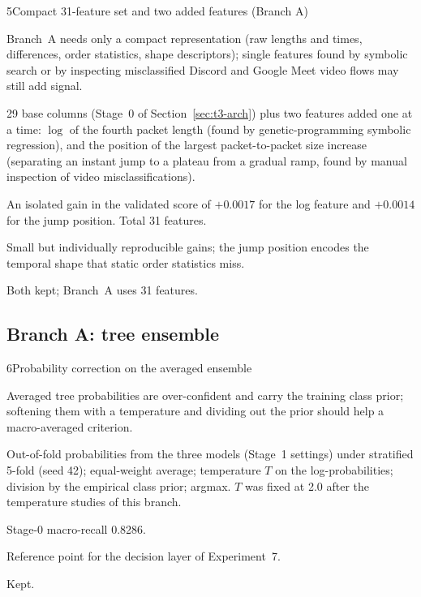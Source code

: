 \begin{explog}{5}{Compact 31-feature set and two added features (Branch A)}
\item[Hypothesis] Branch~A needs only a compact representation (raw lengths and times,
differences, order statistics, shape descriptors); single features found by
symbolic search or by inspecting misclassified Discord and Google Meet video flows
may still add signal.
\item[Method] 29 base columns (Stage~0 of Section~\ref{sec:t3-arch}) plus two features added one at a time:
$\log$ of the fourth packet length (found by genetic-programming symbolic
regression), and the position of the largest packet-to-packet size increase
(separating an instant jump to a plateau from a gradual ramp, found by manual
inspection of video misclassifications).
\item[Result] An isolated gain in the validated score of $+0.0017$ for the log feature and
$+0.0014$ for the jump position. Total 31 features.
\item[Inference] Small but individually reproducible gains; the jump position encodes the
temporal shape that static order statistics miss.
\item[Verdict] Both kept; Branch~A uses 31 features.
\end{explog}

\subsection{Branch A: tree ensemble}

 
\begin{explog}{6}{Probability correction on the averaged ensemble}
\item[Hypothesis] Averaged tree probabilities are over-confident and carry the training class
prior; softening them with a temperature and dividing out the prior should help a
macro-averaged criterion.
\item[Method] Out-of-fold probabilities from the three models (Stage~1 settings) under
stratified 5-fold (seed 42); equal-weight average; temperature $T$ on the
log-probabilities; division by the empirical class prior; argmax. $T$ was fixed at
2.0 after the temperature studies of this branch. %
\item[Result] Stage-0 macro-recall 0.8286.
\item[Inference] Reference point for the decision layer of Experiment~7.
\item[Verdict] Kept.
\end{explog}

